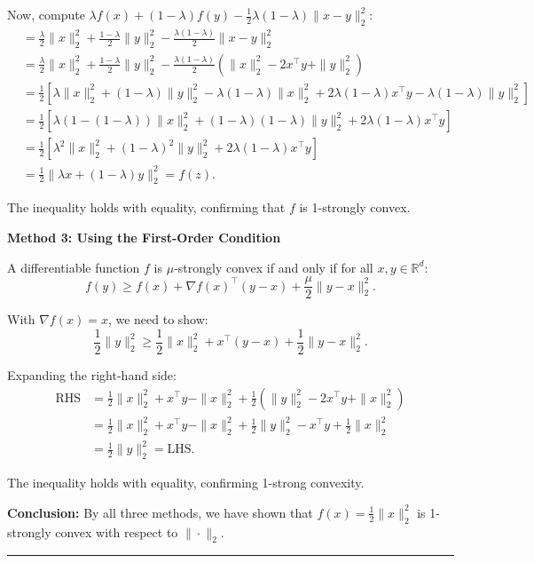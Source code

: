 \documentclass[12pt,letterpaper]{article}
\newenvironment{proof}{\noindent{\bf Proof:}}{\qed\bigskip}
\newcommand{\qed}{\rule{7pt}{7pt}}
\begin{document}
\begin{enumerate}
\begin{proof}
Now, compute $\lambda f(x) + (1-\lambda)f(y) - \frac{1}{2}\lambda(1-\lambda)\|x-y\|_2^2$:
\begin{align*}
&= \frac{\lambda}{2}\|x\|_2^2 + \frac{1-\lambda}{2}\|y\|_2^2 - \frac{\lambda(1-\lambda)}{2}\|x-y\|_2^2 \\
&= \frac{\lambda}{2}\|x\|_2^2 + \frac{1-\lambda}{2}\|y\|_2^2 - \frac{\lambda(1-\lambda)}{2}\left(\|x\|_2^2 - 2x^\top y + \|y\|_2^2\right) \\
&= \frac{1}{2}\left[\lambda\|x\|_2^2 + (1-\lambda)\|y\|_2^2 - \lambda(1-\lambda)\|x\|_2^2 + 2\lambda(1-\lambda)x^\top y - \lambda(1-\lambda)\|y\|_2^2\right] \\
&= \frac{1}{2}\left[\lambda(1-(1-\lambda))\|x\|_2^2 + (1-\lambda)(1-\lambda)\|y\|_2^2 + 2\lambda(1-\lambda)x^\top y\right] \\
&= \frac{1}{2}\left[\lambda^2\|x\|_2^2 + (1-\lambda)^2\|y\|_2^2 + 2\lambda(1-\lambda)x^\top y\right] \\
&= \frac{1}{2}\|\lambda x + (1-\lambda)y\|_2^2 = f(z).
\end{align*}

The inequality holds with equality, confirming that $f$ is 1-strongly convex.

\bigskip

\textbf{Method 3: Using the First-Order Condition}

A differentiable function $f$ is $\mu$-strongly convex if and only if for all $x, y \in \mathbb{R}^d$:
\[
f(y) \geq f(x) + \nabla f(x)^\top (y - x) + \frac{\mu}{2}\|y - x\|_2^2.
\]

With $\nabla f(x) = x$, we need to show:
\[
\frac{1}{2}\|y\|_2^2 \geq \frac{1}{2}\|x\|_2^2 + x^\top(y - x) + \frac{1}{2}\|y - x\|_2^2.
\]

Expanding the right-hand side:
\begin{align*}
\text{RHS} &= \frac{1}{2}\|x\|_2^2 + x^\top y - \|x\|_2^2 + \frac{1}{2}\left(\|y\|_2^2 - 2x^\top y + \|x\|_2^2\right) \\
&= \frac{1}{2}\|x\|_2^2 + x^\top y - \|x\|_2^2 + \frac{1}{2}\|y\|_2^2 - x^\top y + \frac{1}{2}\|x\|_2^2 \\
&= \frac{1}{2}\|y\|_2^2 = \text{LHS}.
\end{align*}

The inequality holds with equality, confirming 1-strong convexity.

\bigskip

\textbf{Conclusion:} By all three methods, we have shown that $f(x) = \frac{1}{2}\|x\|_2^2$ is 1-strongly convex with respect to $\|\cdot\|_2$.


\end{proof}
\end{enumerate}
\end{document}
